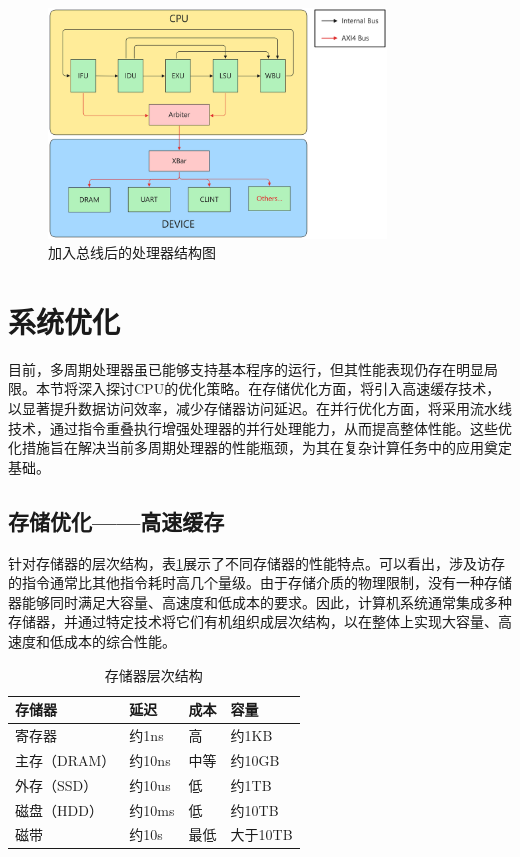 \begin{figure}[htbp]
	\centering
	\includegraphics[width=0.8\textwidth]{image/bus.pdf}
	\caption{加入总线后的处理器结构图}
	\label{fig:bus}
\end{figure}

\section{系统优化}
目前，多周期处理器虽已能够支持基本程序的运行，但其性能表现仍存在明显局限。本节将深入探讨CPU的优化策略。在存储优化方面，将引入高速缓存技术，以显著提升数据访问效率，减少存储器访问延迟。在并行优化方面，将采用流水线技术，通过指令重叠执行增强处理器的并行处理能力，从而提高整体性能。这些优化措施旨在解决当前多周期处理器的性能瓶颈，为其在复杂计算任务中的应用奠定基础。

\subsection{存储优化——高速缓存}

针对存储器的层次结构，表\ref{tab:memorizer_level}展示了不同存储器的性能特点。可以看出，涉及访存的指令通常比其他指令耗时高几个量级。由于存储介质的物理限制，没有一种存储器能够同时满足大容量、高速度和低成本的要求。因此，计算机系统通常集成多种存储器，并通过特定技术将它们有机组织成层次结构，以在整体上实现大容量、高速度和低成本的综合性能。

\begin{table}[H]
	\centering
	\caption{存储器层次结构}
	\begin{tabularx}{\textwidth}{>{\centering\arraybackslash}X >{\centering\arraybackslash}X >{\centering\arraybackslash}X >{\centering\arraybackslash}X}
		\toprule
		\textbf{存储器} & \textbf{延迟} & \textbf{成本} & \textbf{容量} \\
		\midrule
		寄存器          & 约1ns        & 高           & 约1KB        \\
		主存（DRAM）     & 约10ns       & 中等          & 约10GB       \\
		外存（SSD）      & 约10us       & 低           & 约1TB        \\
		磁盘（HDD）      & 约10ms       & 低           & 约10TB       \\
		磁带           & 约10s        & 最低          & 大于10TB      \\
		\bottomrule
	\end{tabularx}
	\label{tab:memorizer_level}
\end{table}

